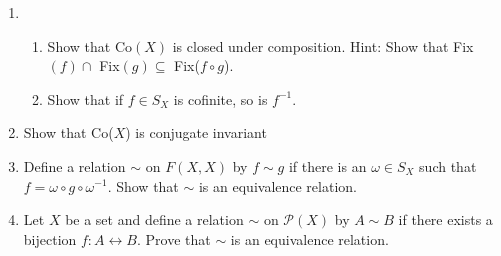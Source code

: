 \documentclass[11pt]{article}
\begin{document}
\begin{enumerate}
\newpage
\item
\begin{enumerate}
\item Show that Co$(X)$ is closed under composition.  Hint: Show that Fix$(f) \cap$ Fix$(g) \subseteq$ Fix($f \circ g$).
\item Show that if $f \in S_X$ is cofinite, so is $f^{-1}$.
\end{enumerate}

\newpage
\item Show that Co($X$) is conjugate invariant

\newpage
\item Define a relation $\sim$ on $F(X, X)$ by $f \sim g$ if there is an $\omega \in S_X$ such that $f = \omega \circ g \circ \omega^{-1}$.  Show that $\sim$ is an
equivalence relation.

\newpage
\item Let $X$ be a set and define a relation $\sim$ on $\mathcal{P}(X)$ by $A \sim B$ if there exists a bijection $f:A \leftrightarrow B$.  Prove that $\sim$ is an
equivalence relation.

\end{enumerate} %
\end{document}
